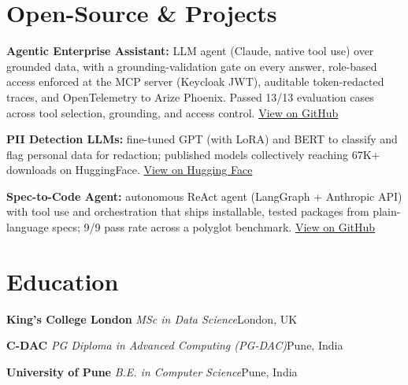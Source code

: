\documentclass[10pt,a4paper]{article}
\newcommand{\sep}{\,\textcolor{accent!60}{\textbar}\,}
\begin{document}
\section{Open-Source \& Projects}
\begin{tight}
  \item \textbf{Agentic Enterprise Assistant:} LLM agent (Claude, native tool use) over grounded data, with a grounding-validation gate on every answer, role-based access enforced at the MCP server (Keycloak JWT), auditable token-redacted traces, and OpenTelemetry to Arize Phoenix. Passed 13/13 evaluation cases across tool selection, grounding, and access control. \href{https://github.com/abhijeetscode/Agentic-Enterprise-Assistant}{View on GitHub}
  \item \textbf{PII Detection LLMs:} fine-tuned GPT (with LoRA) and BERT to classify and flag personal data for redaction; published models collectively reaching 67K+ downloads on HuggingFace. \href{https://huggingface.co/ab-ai/pii_model}{View on Hugging Face}
  \item \textbf{Spec-to-Code Agent:} autonomous ReAct agent (LangGraph + Anthropic API) with tool use and orchestration that ships installable, tested packages from plain-language specs; 9/9 pass rate across a polyglot benchmark. \href{https://github.com/abhijeetscode/Spec-to-Code-Agent}{View on GitHub}
\end{tight}

\section{Education}
{\color{company}\bfseries King's College London}\sep{\itshape MSc in Data Science}\hfill {\color{muted}London, UK}\par\vspace{1pt}
{\color{company}\bfseries C-DAC}\sep{\itshape PG Diploma in Advanced Computing (PG-DAC)}\hfill {\color{muted}Pune, India}\par\vspace{1pt}
{\color{company}\bfseries University of Pune}\sep{\itshape B.E. in Computer Science}\hfill {\color{muted}Pune, India}\par
\end{document}
